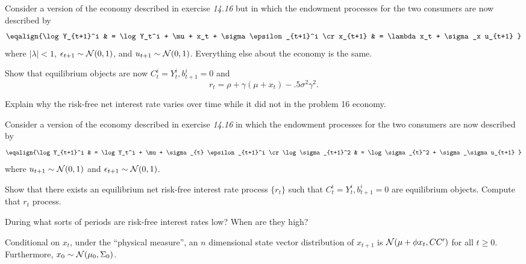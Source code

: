 \medskip

 

\medskip  
\noindent Consider a version of the economy described in exercise {\it 14.16} %
but in which the endowment processes for the two consumers are now described
by
$$ \eqalign{\log Y_{t+1}^i  & = \log Y_t^i + \mu + x_t + \sigma \epsilon_{t+1}^i \cr
             x_{t+1} & = \lambda x_t + \sigma_x u_{t+1} } $$
where $|\lambda | < 1$, $\epsilon_{t+1} \sim {\cal N}(0,1)$,  and $u_{t+1} \sim {\cal N}(0,1)$.
Everything else about the economy is the same.

\medskip

  Show that equilibrium objects are now $C_t^i = Y^i_t, b^i_{t+1} = 0$ and
 $$ r_t = \rho +\gamma (\mu + x_t) - .5 \sigma^2 \gamma^2 .$$

\medskip

  Explain why the risk-free net interest rate varies over time while it did not in the problem 16 economy.


\medskip

 

\medskip

\noindent Consider a version of the economy described in exercise {\it 14.16} in which the endowment processes for the two consumers are now described by
$$ \eqalign{\log Y_{t+1}^i  & = \log Y_t^i + \mu + \sigma_{t} \epsilon_{t+1}^i \cr
             \log \sigma_{t+1}^2 & = \log \sigma_{t}^2 + \sigma_\sigma u_{t+1} } $$
where  $u_{t+1} \sim {\cal N}(0,1)$ and $\epsilon_{t+1} \sim {\cal N}(0,1)$.

\medskip

 Show that there exists an equilibrium net risk-free interest rate process  $\{r_t\}$ such that $C_t^i = Y^i_t, b^i_{t+1} = 0$ are equilibrium objects.
Compute that $r_t$ process.

\medskip
{} During what sorts of periods are risk-free interest rates low? When are they high?



 \quad {}
\medskip
\noindent Conditional on $x_t$, under the ``physical measure'', an $n$ dimensional state vector  distribution of $x_{t+1}$
is ${\cal N}(\mu + \phi x_t, CC')$ for all $t \geq 0$. Furthermore, $x_0 \sim {\cal N}(\mu_0, \Sigma_0)$.

